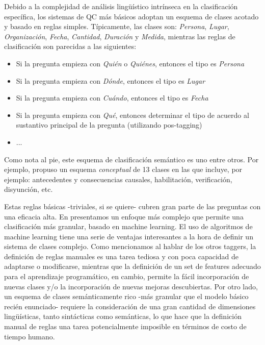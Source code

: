 Debido a la complejidad de análisis lingüístico intrínseca en la clasificación específica, los sistemas de QC más básicos adoptan un esquema de clases acotado y basado en reglas simples. Típicamente, las clases son: \textit{Persona}, \textit{Lugar}, \textit{Organización}, \textit{Fecha}, \textit{Cantidad}, \textit{Duración} y \textit{Medida}, mientras las reglas de clasificación son parecidas a las siguientes:
\begin{itemize}
\item Si la pregunta empieza con \textit{Quién} o \textit{Quiénes}, entonces el tipo es \textit{Persona}
\item Si la pregunta empieza con \textit{Dónde}, entonces el tipo es \textit{Lugar}
\item Si la pregunta empieza con \textit{Cuándo}, entonces el tipo es \textit{Fecha}
\item Si la pregunta empieza con \textit{Qué}, entonces determinar el tipo de acuerdo al sustantivo principal de la pregunta (utilizando pos-tagging)
\item ...
\end{itemize}

Como nota al pie, este esquema de clasificación semántico es uno entre otros. Por ejemplo, \cite{QC-other} propuso un esquema \textit{conceptual} de 13 clases en las que incluye, por ejemplo: antecedentes y consecuencias causales, habilitación, verificación, disyunción, etc.

Estas reglas básicas -triviales, si se quiere- cubren gran parte de las preguntas con una eficacia alta. En  presentamos un enfoque más complejo que permite una clasificación más granular, basado en machine learning. El uso de algoritmos de machine learning tiene una serie de ventajas interesantes a la hora de definir un sistema de clases complejo. Como mencionamos al hablar de los otros taggers, la definición de reglas manuales es una tarea tediosa y con poca capacidad de adaptarse o modificarse, mientras que la definición de un set de features adecuado para el aprendizaje programático, en cambio, permite la fácil incorporación de nuevas clases y/o la incorporación de nuevas mejoras descubiertas. Por otro lado, un esquema de clases semánticamente rico -más granular que el modelo básico recién enunciado- requiere la consideración de una gran cantidad de dimensiones lingüísticas, tanto sintácticas como semánticas, lo que hace que la definición manual de reglas una tarea potencialmente imposible en términos de costo de tiempo humano.

